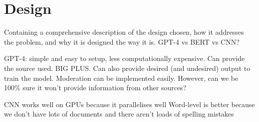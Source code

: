 \chapter{Design}

Containing a comprehensive description of the design chosen, how it addresses the problem, and why it is designed the way it is. GPT-4 vs BERT vs CNN?

GPT-4: simple and easy to setup, less computationally expensive. Can provide the source used. BIG PLUS. Can also provide desired (and undesired) output to train the model. Moderation can be implemented easily. However, can we be 100\% sure it won't provide information from other sources?  


CNN works well on GPUs because it parallelises well
Word-level is better because we don't have lots of documents and there aren't loads of spelling mistakes





